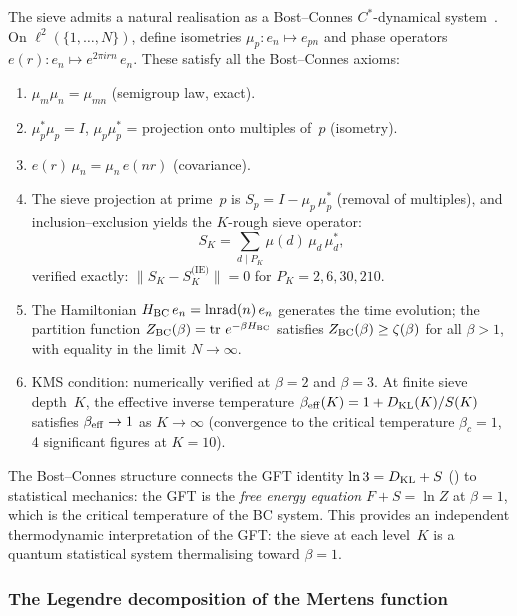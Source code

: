 \documentclass[12pt,a4paper]{article}
\begin{document}
The sieve admits a natural realisation as a Bost--Connes
$C^*$-dynamical system~\cite{BostConnes1995}.
On $\ell^2(\{1,\ldots,N\})$, define isometries
$\mu_p\colon e_n \mapsto e_{pn}$ and phase operators
$e(r)\colon e_n \mapsto e^{2\pi i r n}\,e_n$.
These satisfy all the Bost--Connes axioms:
\begin{enumerate}[nosep]
\item $\mu_m \mu_n = \mu_{mn}$ (semigroup law, exact).
\item $\mu_p^* \mu_p = I$, $\mu_p \mu_p^*$ = projection onto
  multiples of~$p$ (isometry).
\item $e(r)\,\mu_n = \mu_n\,e(nr)$ (covariance).
\item The sieve projection at prime~$p$ is
  $S_p = I - \mu_p\,\mu_p^*$ (removal of multiples), and
  inclusion--exclusion yields the $K$-rough sieve operator:
  \begin{equation}
    S_K = \sum_{d \mid P_K} \mu(d)\,\mu_d\,\mu_d^*,
    \label{eq:sieve_bc}
  \end{equation}
  verified exactly: $\|S_K - S_K^{\text{(IE)}}\| = 0$ for
  $P_K = 2,6,30,210$.
\item The Hamiltonian $H_{\rm BC}\,e_n = \ln\!\operatorname{rad}(n)\,e_n$
  generates the time evolution; the partition function
  $Z_{\rm BC}(\beta) = \operatorname{tr}\,e^{-\beta H_{\rm BC}}$
  satisfies $Z_{\rm BC}(\beta) \geq \zeta(\beta)$ for all
  $\beta > 1$, with equality in the limit $N \to \infty$.
\item KMS condition: numerically verified at $\beta = 2$ and $\beta = 3$.
  At finite sieve depth~$K$, the effective inverse temperature
  $\beta_{\rm eff}(K) = 1 + D_{\rm KL}(K)/S(K)$ satisfies
  $\beta_{\rm eff} \to 1$ as $K \to \infty$ (convergence to the
  critical temperature $\beta_c = 1$, 4 significant figures at $K = 10$).
\end{enumerate}

The Bost--Connes structure connects the GFT identity
$\ln 3 = D_{\rm KL} + S$ (\cite{companion_M1}) to statistical mechanics:
the GFT is the \emph{free energy equation} $F + S = \ln Z$ at
$\beta = 1$, which is the critical temperature of the BC system.
This provides an independent thermodynamic interpretation of the
GFT: the sieve at each level~$K$ is a quantum statistical system
thermalising toward $\beta = 1$.

\subsubsection{The Legendre decomposition of the Mertens function}
\label{subsec:ch7_legendre}
\end{document}
